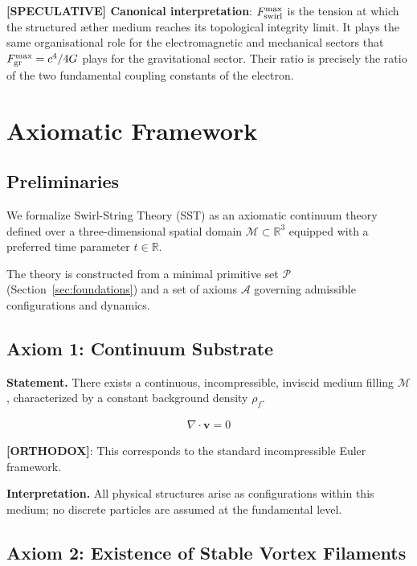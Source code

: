 \documentclass[11pt]{article}
\theoremstyle{definition}
\theoremstyle{plain}
\theoremstyle{remark}
\newcommand{\rhoF}{{\rho_{\!f}}}
\begin{document}
        \textbf{[SPECULATIVE] Canonical interpretation}: $F_{\rm swirl}^{\max}$ is the tension at which the structured \ae ther medium reaches its topological integrity limit. It plays the same organisational role for the electromagnetic and mechanical sectors that $F_{\rm gr}^{\max} = c^4/4G$ plays for the gravitational sector. Their ratio is precisely the ratio of the two fundamental coupling constants of the electron.

\section{Axiomatic Framework}
    \label{sec:axioms}
    
    \subsection{Preliminaries}
        
        We formalize Swirl-String Theory (SST) as an axiomatic continuum theory defined over a three-dimensional spatial domain $\mathcal{M} \subset \mathbb{R}^3$ equipped with a preferred time parameter $t \in \mathbb{R}$.
        
        The theory is constructed from a minimal primitive set $\mathcal{P}$ (Section~\ref{sec:foundations}) and a set of axioms $\mathcal{A}$ governing admissible configurations and dynamics.
    
    \subsection{Axiom 1: Continuum Substrate}
        
        \textbf{Statement.}
        There exists a continuous, incompressible, inviscid medium filling $\mathcal{M}$, characterized by a constant background density $\rhoF$.
        
        \begin{align}
            \nabla \cdot \mathbf{v} = 0
        \end{align}
        
        \textbf{[ORTHODOX]}: This corresponds to the standard incompressible Euler framework.
        
        \textbf{Interpretation.}
        All physical structures arise as configurations within this medium; no discrete particles are assumed at the fundamental level.
    
    \subsection{Axiom 2: Existence of Stable Vortex Filaments}
        
\end{document}
